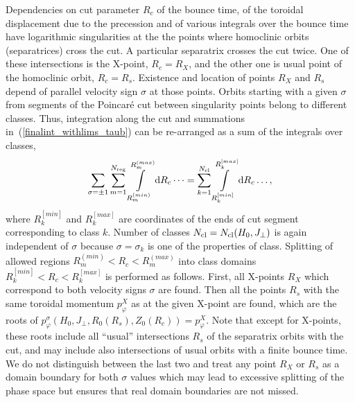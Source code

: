 \documentclass[preprint,prb,aps]{revtex4-1}
\newcommand{\eq}[1]{(\ref{#1})}
\newcommand{\rd}{{\rm d}}
\begin{document}
Dependencies on cut parameter $R_c$ of the bounce time, 
of the toroidal displacement due to the precession 
and of various integrals over the bounce time 
have logarithmic singularities at the the points where homoclinic orbits
(separatrices) cross the cut. A particular separatrix crosses the cut twice.
One of these intersections is the X-point, $R_c=R_X$, and the other one is usual
point of the homoclinic orbit, $R_c=R_s$. Existence and location of points $R_X$ 
and $R_s$ depend of parallel velocity sign $\sigma$ at those points. Orbits starting
with a given $\sigma$ from segments of the Poincar\'e cut between singularity points
belong to different classes. 
Thus, integration along the cut and summations
in~\eq{finalint_withlims_taub} can be re-arranged as a sum of the integrals
over classes,
$$
\sum_{\sigma=\pm 1} \sum\limits_{m=1}^{N_{\rm reg}}
\int\limits_{R^{(min)}_m}^{R^{(max)}_m} \rd R_c
\dots
=
\sum\limits_{k=1}^{N_{\rm cl}}
\int\limits_{R^{[min]}_k}^{R^{[max]}_k} \rd R_c
\dots,
$$
where $R^{[min]}_k$ and $R^{[max]}_k$ are coordinates of the ends of cut segment 
corresponding to class $k$. Number of classes $N_{\rm cl}=N_{\rm cl}(H_0,J_\perp)$
is again independent of $\sigma$ because $\sigma=\sigma_k$ is one of the properties
of class.
Splitting of allowed regions 
$R^{(min)}_m < R_c < R^{(max)}_m$ into class domains $R^{[min]}_k<R_c<R^{[max]}_k$
is performed as follows. First, all X-points $R_X$ which correspond to both velocity 
signs $\sigma$ are found. Then all the points $R_s$ with the same toroidal momentum
$p_\varphi^X$ as at the given X-point are found, which are the roots of
$p_\varphi^\sigma(H_0,J_\perp,R_0(R_s),Z_0(R_c))=p_\varphi^X$. 
Note that except for X-points, these roots include all ``usual'' intersections $R_s$ 
of the separatrix orbits with the cut, and may include also intersections
of usual orbits with a finite bounce time. We do not distinguish between the last 
two and treat any point $R_X$ or $R_s$ as a domain boundary for both $\sigma$ values
which may lead to excessive splitting of the phase space but ensures that real domain 
boundaries are not missed.
\end{document}
